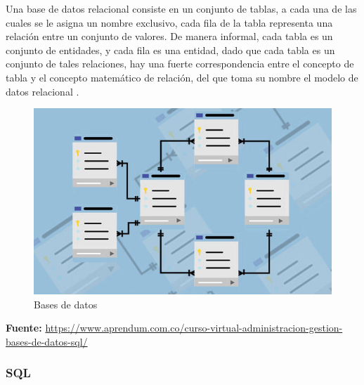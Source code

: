 		{Una base de datos relacional consiste en un conjunto de tablas, a cada una de las cuales se le asigna un nombre exclusivo, cada fila de la tabla representa una relación entre un conjunto de valores. De manera informal, cada tabla es un conjunto de entidades, y cada fila es una entidad, dado que cada tabla es un conjunto de tales relaciones, hay una fuerte correspondencia entre el concepto de tabla y el concepto matemático de relación, del que toma su nombre el modelo de datos relacional \cite{dataBase}.
		
		\begin{figure}[H]
			\centering
			\includegraphics[width=0.8\linewidth]{description/framework/database.jpg}
			\caption{Bases de datos}
		\end{figure}
		\begin{center}
			\textbf{Fuente:} \url{https://www.aprendum.com.co/curso-virtual-administracion-gestion-bases-de-datos-sql/}
		\end{center}
		}
	
		\subsubsection{SQL}
		
